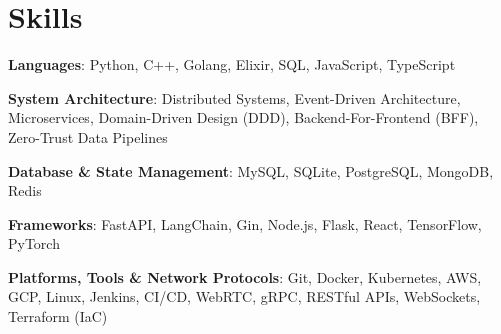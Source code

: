 \section{Skills}
\begin{resumeitems}
  \item \textbf{Languages}: Python, C++, Golang, Elixir, SQL, JavaScript, TypeScript 
  \item \textbf{System Architecture}: Distributed Systems, Event-Driven Architecture, Microservices, Domain-Driven Design (DDD), Backend-For-Frontend (BFF), Zero-Trust Data Pipelines
  \item \textbf{Database \& State Management}: MySQL, SQLite, PostgreSQL, MongoDB, Redis
  \item \textbf{Frameworks}: FastAPI, LangChain, Gin, Node.js, Flask, React, TensorFlow, PyTorch
\item \textbf{Platforms, Tools \& Network Protocols}: Git, Docker, Kubernetes, AWS, GCP, Linux, Jenkins, CI/CD, WebRTC, gRPC, RESTful APIs, WebSockets, Terraform (IaC) 
\end{resumeitems}

